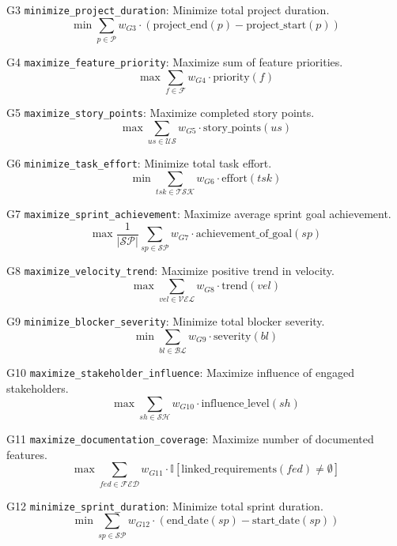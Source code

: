 \documentclass[12pt]{article}
\begin{document}
    \item[G3] \texttt{minimize\_project\_duration}: Minimize total project duration.
    \[
    \min \sum_{p \in \mathcal{P}} w_{G3} \cdot (\text{project\_end}(p) - \text{project\_start}(p))
    \]

    \item[G4] \texttt{maximize\_feature\_priority}: Maximize sum of feature priorities.
    \[
    \max \sum_{f \in \mathcal{F}} w_{G4} \cdot \text{priority}(f)
    \]

    \item[G5] \texttt{maximize\_story\_points}: Maximize completed story points.
    \[
    \max \sum_{us \in \mathcal{US}} w_{G5} \cdot \text{story\_points}(us)
    \]

    \item[G6] \texttt{minimize\_task\_effort}: Minimize total task effort.
    \[
    \min \sum_{tsk \in \mathcal{TSK}} w_{G6} \cdot \text{effort}(tsk)
    \]

    \item[G7] \texttt{maximize\_sprint\_achievement}: Maximize average sprint goal achievement.
    \[
    \max \frac{1}{|\mathcal{SP}|} \sum_{sp \in \mathcal{SP}} w_{G7} \cdot \text{achievement\_of\_goal}(sp)
    \]

    \item[G8] \texttt{maximize\_velocity\_trend}: Maximize positive trend in velocity.
    \[
    \max \sum_{vel \in \mathcal{VEL}} w_{G8} \cdot \text{trend}(vel)
    \]

    \item[G9] \texttt{minimize\_blocker\_severity}: Minimize total blocker severity.
    \[
    \min \sum_{bl \in \mathcal{BL}} w_{G9} \cdot \text{severity}(bl)
    \]

    \item[G10] \texttt{maximize\_stakeholder\_influence}: Maximize influence of engaged stakeholders.
    \[
    \max \sum_{sh \in \mathcal{SH}} w_{G10} \cdot \text{influence\_level}(sh)
    \]

    \item[G11] \texttt{maximize\_documentation\_coverage}: Maximize number of documented features.
    \[
    \max \sum_{fed \in \mathcal{FED}} w_{G11} \cdot \mathbb{I}[\text{linked\_requirements}(fed) \neq \emptyset]
    \]

    \item[G12] \texttt{minimize\_sprint\_duration}: Minimize total sprint duration.
    \[
    \min \sum_{sp \in \mathcal{SP}} w_{G12} \cdot (\text{end\_date}(sp) - \text{start\_date}(sp))
    \]
\end{document}
